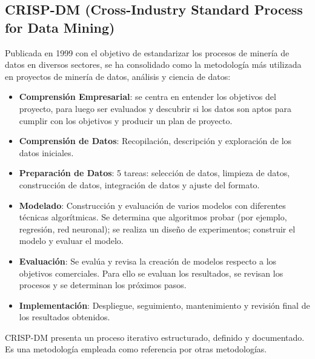 \documentclass[12pt]{book}
\begin{document}
\subsection{CRISP-DM (Cross-Industry Standard Process for Data Mining)}
Publicada en 1999 con el objetivo de estandarizar los procesos de minería de datos en diversos sectores, se ha consolidado como la metodología más utilizada en proyectos de minería de datos, análisis y ciencia de datos:
\begin{itemize}
    \item \textbf{Comprensión Empresarial}: se centra en entender los objetivos del proyecto, para luego ser evaluados y descubrir si     los datos son aptos para cumplir con los objetivos y producir un plan de proyecto.
    \item \textbf{Comprensión de Datos}: Recopilación, descripción y exploración de los datos iniciales.
    \item \textbf{Preparación de Datos}: 5 tareas: selección de datos, limpieza de datos, construcción de datos, integración de datos y ajuste del formato.
    \item \textbf{Modelado}: Construcción y evaluación de varios modelos con diferentes técnicas algorítmicas. Se determina que algoritmos probar (por ejemplo, regresión, red neuronal); se realiza un     diseño de experimentos; construir el modelo y evaluar el modelo.
    \item \textbf{Evaluación}: Se evalúa y revisa la creación de modelos respecto a los objetivos comerciales. Para ello se evaluan los resultados, se revisan los procesos y se determinan los próximos pasos.
    \item \textbf{Implementación}: Despliegue, seguimiento, mantenimiento y revisión final de los resultados obtenidos.
\end{itemize}
CRISP-DM presenta un proceso iterativo estructurado, definido y documentado. Es una metodología empleada como referencia por otras metodologías.
\end{document}
